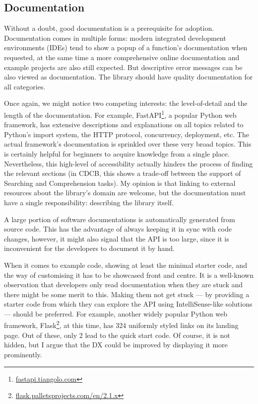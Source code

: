 \subsection{Documentation}

Without a doubt, good documentation is a prerequisite for adoption. Documentation comes in multiple forms: modern integrated development environments (IDEs) tend to show a popup of a function's documentation when requested, at the same time a more comprehensive online documentation and example projects are also still expected. But descriptive error messages can be also viewed as documentation. The library should have quality documentation for all categories.

Once again, we might notice two competing interests: the level-of-detail and the length of the documentation. For example, FastAPI\footnote{\href{https://fastapi.tiangolo.com/async/\#concurrent-burgers}{fastapi.tiangolo.com}}, a popular Python web framework, has extensive descriptions and explanations on all topics related to Python's import system, the HTTP protocol, concurrency, deployment, etc. The actual framework's documentation is sprinkled over these very broad topics. This is certainly helpful for beginners to acquire knowledge from a single place. Nevertheless, this high-level of accessibility actually hinders the process of finding the relevant sections (in CDCB, this shows a trade-off between the support of Searching and Comprehension tasks). My opinion is that linking to external resources about the library's domain are welcome, but the documentation must have a single responsibility: describing the library itself.

A large portion of software documentations is automatically generated from source code. This has the advantage of always keeping it in sync with code changes, however, it might also signal that the API is too large, since it is inconvenient for the developers to document it by hand.

When it comes to example code, showing at least the minimal starter code, and the way of customising it has to be showcased front and centre. It is a well-known observation that developers only read documentation when they are stuck and there might be some merit to this. Making them not get stuck --- by providing a starter code from which they can explore the API using IntelliSense-like solutions --- should be preferred. For example, another widely popular Python web framework, Flask\footnote{\href{https://flask.palletsprojects.com/en/2.1.x/}{flask.palletsprojects.com/en/2.1.x}}, at this time, has 324 uniformly styled links on its landing page. Out of these, only 2 lead to the quick start code. Of course, it is not hidden, but I argue that the DX could be improved by displaying it more prominently.

